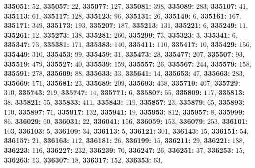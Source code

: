 \textsf{\bfseries 335051:} $52$, \textsf{\bfseries 335057:} $22$, \textsf{\bfseries 335077:} $127$, \textsf{\bfseries 335081:} $398$, \textsf{\bfseries 335089:} $283$, \textsf{\bfseries 335107:} $41$, \textsf{\bfseries 335113:} $61$, \textsf{\bfseries 335117:} $128$, \textsf{\bfseries 335123:} $96$, \textsf{\bfseries 335131:} $26$, \textsf{\bfseries 335149:} $6$, \textsf{\bfseries 335161:} $167$, \textsf{\bfseries 335171:} $349$, \textsf{\bfseries 335173:} $193$, \textsf{\bfseries 335207:} $187$, \textsf{\bfseries 335213:} $131$, \textsf{\bfseries 335221:} $6$, \textsf{\bfseries 335249:} $11$, \textsf{\bfseries 335261:} $12$, \textsf{\bfseries 335273:} $138$, \textsf{\bfseries 335281:} $260$, \textsf{\bfseries 335299:} $73$, \textsf{\bfseries 335323:} $3$, \textsf{\bfseries 335341:} $6$, \textsf{\bfseries 335347:} $73$, \textsf{\bfseries 335381:} $171$, \textsf{\bfseries 335383:} $140$, \textsf{\bfseries 335411:} $110$, \textsf{\bfseries 335417:} $10$, \textsf{\bfseries 335429:} $156$, \textsf{\bfseries 335449:} $310$, \textsf{\bfseries 335453:} $99$, \textsf{\bfseries 335459:} $31$, \textsf{\bfseries 335473:} $28$, \textsf{\bfseries 335477:} $207$, \textsf{\bfseries 335507:} $93$, \textsf{\bfseries 335519:} $479$, \textsf{\bfseries 335527:} $40$, \textsf{\bfseries 335539:} $159$, \textsf{\bfseries 335557:} $26$, \textsf{\bfseries 335567:} $244$, \textsf{\bfseries 335579:} $158$, \textsf{\bfseries 335591:} $278$, \textsf{\bfseries 335609:} $88$, \textsf{\bfseries 335633:} $33$, \textsf{\bfseries 335641:} $14$, \textsf{\bfseries 335653:} $47$, \textsf{\bfseries 335663:} $283$, \textsf{\bfseries 335669:} $171$, \textsf{\bfseries 335681:} $23$, \textsf{\bfseries 335689:} $209$, \textsf{\bfseries 335693:} $438$, \textsf{\bfseries 335719:} $407$, \textsf{\bfseries 335729:} $310$, \textsf{\bfseries 335743:} $219$, \textsf{\bfseries 335747:} $14$, \textsf{\bfseries 335771:} $6$, \textsf{\bfseries 335807:} $55$, \textsf{\bfseries 335809:} $117$, \textsf{\bfseries 335813:} $38$, \textsf{\bfseries 335821:} $55$, \textsf{\bfseries 335833:} $411$, \textsf{\bfseries 335843:} $119$, \textsf{\bfseries 335857:} $23$, \textsf{\bfseries 335879:} $65$, \textsf{\bfseries 335893:} $110$, \textsf{\bfseries 335897:} $71$, \textsf{\bfseries 335917:} $132$, \textsf{\bfseries 335941:} $19$, \textsf{\bfseries 335953:} $812$, \textsf{\bfseries 335957:} $8$, \textsf{\bfseries 335999:} $86$, \textsf{\bfseries 336029:} $60$, \textsf{\bfseries 336031:} $22$, \textsf{\bfseries 336041:} $156$, \textsf{\bfseries 336059:} $153$, \textsf{\bfseries 336079:} $253$, \textsf{\bfseries 336101:} $103$, \textsf{\bfseries 336103:} $5$, \textsf{\bfseries 336109:} $34$, \textsf{\bfseries 336113:} $5$, \textsf{\bfseries 336121:} $301$, \textsf{\bfseries 336143:} $15$, \textsf{\bfseries 336151:} $54$, \textsf{\bfseries 336157:} $21$, \textsf{\bfseries 336163:} $112$, \textsf{\bfseries 336181:} $26$, \textsf{\bfseries 336199:} $15$, \textsf{\bfseries 336211:} $29$, \textsf{\bfseries 336221:} $188$, \textsf{\bfseries 336223:} $116$, \textsf{\bfseries 336227:} $232$, \textsf{\bfseries 336239:} $70$, \textsf{\bfseries 336247:} $26$, \textsf{\bfseries 336251:} $37$, \textsf{\bfseries 336253:} $15$, \textsf{\bfseries 336263:} $13$, \textsf{\bfseries 336307:} $18$, \textsf{\bfseries 336317:} $152$, \textsf{\bfseries 336353:} $63$, 
